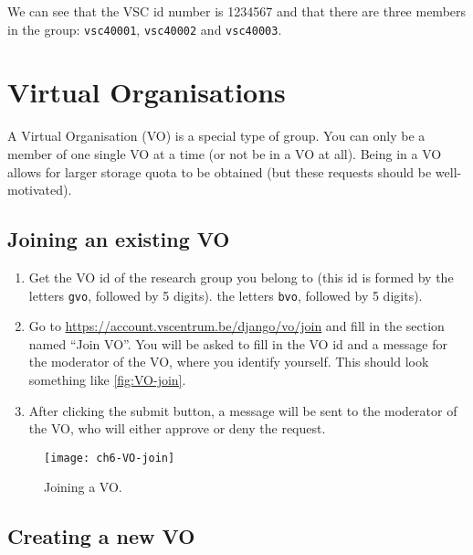 We can see that the VSC id number is 1234567 and that there are three members in
the group: \lstinline|vsc40001|, \lstinline|vsc40002| and \lstinline|vsc40003|.

\ifleuven\else\ifantwerpen\else
\section{Virtual Organisations}
\label{sec:virtual-organisations}
\hypertarget{sec:virtual-organisation}{}

A Virtual Organisation (VO) is a special type of group. You can only be a member
of one single VO at a time (or not be in a VO at all).
Being in a VO allows for larger storage quota to be obtained
(but these requests should be well-motivated).

\subsection{Joining an existing VO}

\begin{enumerate}
    \item Get the VO id of the research group you belong to (this id is formed by
\ifgent
        the letters \lstinline|gvo|, followed by 5 digits).
\fi
\ifbrussel
        the letters \lstinline|bvo|, followed by 5 digits).
\fi
    \item Go to \url{https://account.vscentrum.be/django/vo/join} and fill in the
        section named ``Join VO''. You will be asked to fill in the VO id and a message for
        the moderator of the VO, where you identify yourself. This should look something
        like \autoref{fig:VO-join}.
    \item After clicking the submit button, a message will be sent to the moderator
    of the VO, who will either approve or deny the request.
\end{enumerate}



\begin{figure}[!htbp]
  \caption{Joining a VO.}
  \centering
    \texttt{[image: ch6-VO-join]}
\end{figure}\label{fig:VO-join}

\subsection{Creating a new VO}

